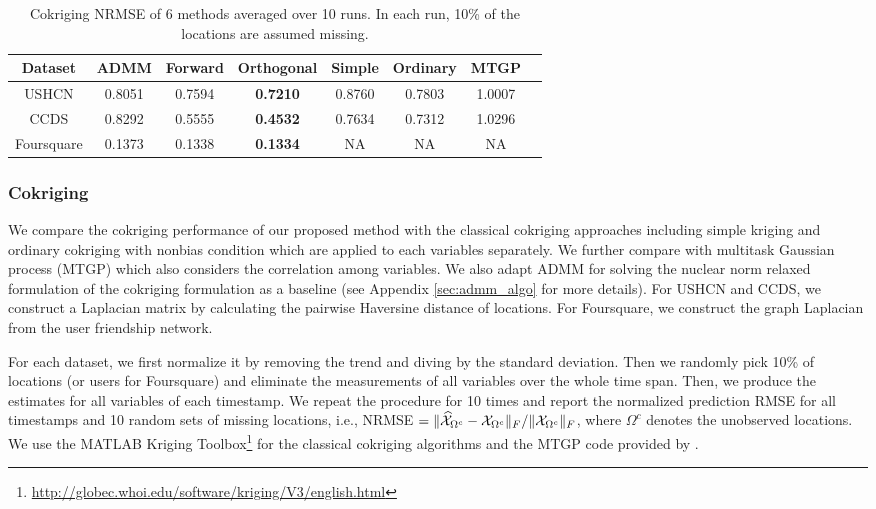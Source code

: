 \begin{table*}[t]
\caption{Cokriging NRMSE of 6 methods averaged over 10 runs. In each run, 10\% of the locations are assumed missing. } %
\label{tab:cokrig_RMSE}
\begin{center}
\begin{tiny}
\begin{sc}
\centering  \footnotesize%
\begin{tabular}{c c c c c c c c} %
\hline
Dataset & ADMM & Forward & Orthogonal  & Simple& Ordinary& MTGP \\
\hline
USHCN  &  0.8051 & 0.7594 & \textbf{0.7210}&  0.8760& 0.7803 & 1.0007 \\
CCDS & 0.8292 & 0.5555& \textbf{0.4532} & 0.7634 & 0.7312 & 1.0296 \\
Foursquare & 0.1373 & 0.1338& \textbf{0.1334} & NA & NA & NA \\
\hline
\end{tabular}
\end{sc}
\end{tiny}
\end{center}
\vspace{-0.25in}
\end{table*}

\subsubsection{Cokriging}
We compare the cokriging performance of our proposed method with the classical cokriging approaches including simple kriging and ordinary cokriging with nonbias condition \cite{isaaks2011applied} which are applied to each variables separately. We further compare with multitask Gaussian process (MTGP) \cite{bonilla2007multi} which also considers the correlation among variables. We also adapt ADMM for solving the nuclear norm relaxed formulation of the cokriging formulation as a baseline (see  Appendix \ref{sec:admm_algo} for more details). For USHCN and CCDS, we construct a Laplacian matrix by calculating the pairwise Haversine distance of locations. For Foursquare, we construct the graph Laplacian from the user friendship network.

For each dataset, we first normalize it by removing the trend and diving by the standard deviation. Then we randomly pick 10\% of locations (or users for Foursquare) and eliminate the measurements of all variables over the whole time span. Then, we produce the estimates for all variables of each timestamp. We repeat the procedure for 10 times and report the normalized prediction  RMSE for all timestamps and 10 random sets of missing locations, i.e., NRMSE $=\|\widehat{{\mathcal X}}_{\Omega^c} - {\mathcal X}_{\Omega^c}\|_F/\|{\mathcal X}_{\Omega^c}\|_F$, where $\Omega^c$ denotes the unobserved locations. We use the  MATLAB Kriging Toolbox\footnote{\url{ http://globec.whoi.edu/software/kriging/V3/english.html}} for the classical cokriging algorithms and the MTGP code provided by \cite{bonilla2007multi}. 

